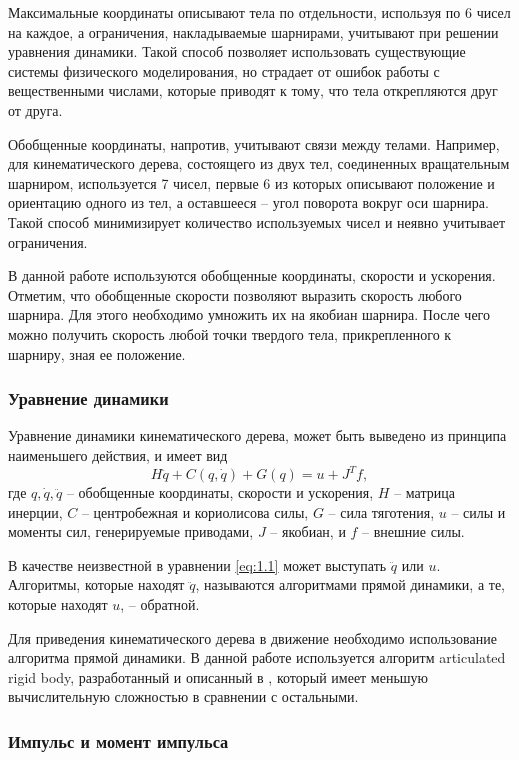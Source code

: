 Максимальные координаты описывают тела по отдельности, используя по 6 чисел на каждое, а ограничения, накладываемые шарнирами, учитывают при решении уравнения динамики. Такой способ позволяет использовать существующие системы физического моделирования, но страдает от ошибок работы с вещественными числами, которые приводят к тому, что тела открепляются друг от друга.

Обобщенные координаты, напротив, учитывают связи между телами. Например, для кинематического дерева, состоящего из двух тел, соединенных вращательным шарниром, используется 7 чисел, первые 6 из которых описывают положение и ориентацию одного из тел, а оставшееся -- угол поворота вокруг оси шарнира. Такой способ минимизирует количество используемых чисел и неявно учитывает ограничения.

В данной работе используются обобщенные координаты, скорости и ускорения. Отметим, что обобщенные скорости позволяют выразить скорость любого шарнира. Для этого необходимо умножить их на якобиан шарнира. После чего можно получить скорость любой точки твердого тела, прикрепленного к шарниру, зная ее положение.

\subsubsection{Уравнение динамики}

Уравнение динамики кинематического дерева, может быть выведено из принципа наименьшего действия, и имеет вид
\begin{equation*}
  H \ddot{q} + C(q, \dot{q}) + G(q) = u + J^{T} f, \tag{1.1}\label{eq:1.1}
\end{equation*}
где $q, \dot{q}, \ddot{q}$ -- обобщенные координаты, скорости и ускорения, $H$ -- матрица инерции, $C$ -- центробежная и кориолисова силы, $G$ -- сила тяготения, $u$ -- силы и моменты сил, генерируемые приводами, $J$ -- якобиан, и $f$ -- внешние силы.

В качестве неизвестной в уравнении \ref{eq:1.1} может выступать $\ddot{q}$ или $u$. Алгоритмы, которые находят $\ddot{q}$, называются алгоритмами прямой динамики, а те, которые находят $u$, -- обратной.

Для приведения кинематического дерева в движение необходимо использование алгоритма прямой динамики. В данной работе используется алгоритм articulated rigid body, разработанный и описанный в \cite{Featherstone}, который имеет меньшую вычислительную сложностью в сравнении с остальными.

\subsubsection{Импульс и момент импульса}

